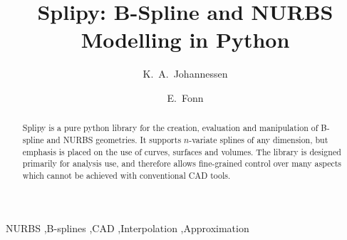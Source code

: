 \documentclass[preprint,12pt, a4paper]{elsarticle}
\begin{document}
\begin{frontmatter}



\title{Splipy: B-Spline and NURBS Modelling in Python}


\author{K.~A.~Johannessen}
\author{E.~Fonn}

\address{SINTEF Digital, PO Box 4760, 7465, Trondheim, Norway\\
         Kjetil.Johannessen@sintef.no \\
         Eivind.Fonn@sintef.no
         }

\begin{abstract}
Splipy is a pure python library for the creation, evaluation and manipulation of B-spline and NURBS geometries.
It supports $n$-variate splines of any dimension, but emphasis is placed on the use of curves, surfaces and volumes.
The library is designed primarily for analysis use, and therefore allows fine-grained control over many aspects which cannot be achieved with conventional CAD tools.

\end{abstract}

\begin{keyword}
NURBS \sep B-splines \sep CAD \sep Interpolation \sep Approximation



\end{keyword}

\end{frontmatter}
\end{document}
